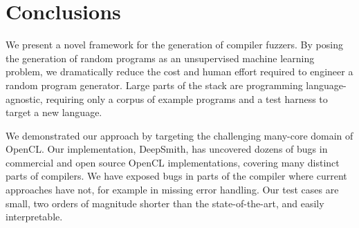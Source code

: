 \section{Conclusions}\label{sec:conclusion}

We present a novel framework for the generation of compiler fuzzers. By posing the generation of random programs as an unsupervised machine learning problem, we dramatically reduce the cost and human effort required to engineer a random program generator. Large parts of the stack are programming language-agnostic, requiring only a corpus of example programs and a test harness to target a new language.

We demonstrated our approach by targeting the challenging many-core domain of OpenCL. Our implementation, DeepSmith, has uncovered dozens of bugs in commercial and open source OpenCL implementations, covering many distinct parts of compilers. We have exposed bugs in parts of the compiler where current approaches have not, for example in missing error handling. Our test cases are small, two orders of magnitude shorter than the state-of-the-art, and easily interpretable. 


